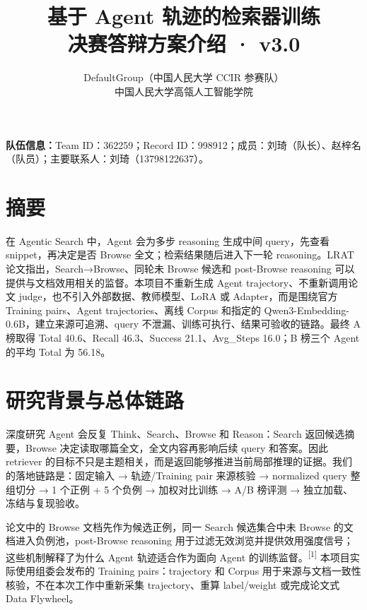 \documentclass[UTF8,a4paper,10pt]{ctexart}
\title{\bfseries 基于 Agent 轨迹的检索器训练\\[-1mm]\large 决赛答辩方案介绍 · v3.0}
\author{DefaultGroup（中国人民大学 CCIR 参赛队）\\中国人民大学高瓴人工智能学院}
\date{}
\begin{document}
\pagestyle{plain}
\maketitle
\vspace{-7pt}
\noindent\small
\textbf{队伍信息：}Team ID：362259；Record ID：998912；成员：刘琦（队长）、赵梓名（队员）；主要联系人：刘琦（13798122637）。\par
\vspace{-2pt}

\section*{摘要}
在 Agentic Search 中，Agent 会为多步 reasoning 生成中间 query，先查看 snippet，再决定是否 Browse 全文；检索结果随后进入下一轮 reasoning。LRAT 论文指出，Search→Browse、同轮未 Browse 候选和 post-Browse reasoning 可以提供与文档效用相关的监督。本项目不重新生成 Agent trajectory、不重新调用论文 judge，也不引入外部数据、教师模型、LoRA 或 Adapter，而是围绕官方 Training pairs、Agent trajectories、离线 Corpus 和指定的 Qwen3-Embedding-0.6B，建立来源可追溯、query 不泄漏、训练可执行、结果可验收的链路。最终 A 榜取得 Total 40.6、Recall 46.3、Success 21.1、Avg\_Steps 16.0；B 榜三个 Agent 的平均 Total 为 56.18。

\section{研究背景与总体链路}
深度研究 Agent 会反复 Think、Search、Browse 和 Reason：Search 返回候选摘要，Browse 决定读取哪篇全文，全文内容再影响后续 query 和答案。因此 retriever 的目标不只是主题相关，而是返回能够推进当前局部推理的证据。我们的落地链路是：固定输入 → 轨迹/Training pair 来源核验 → normalized query 整组切分 → 1 个正例 + 5 个负例 → 加权对比训练 → A/B 榜评测 → 独立加载、冻结与复现验收。

\begin{center}
\end{center}

论文中的 Browse 文档先作为候选正例，同一 Search 候选集合中未 Browse 的文档进入负例池，post-Browse reasoning 用于过滤无效浏览并提供效用强度信号；这些机制解释了为什么 Agent 轨迹适合作为面向 Agent 的训练监督。\textsuperscript{[1]} 本项目实际使用组委会发布的 Training pairs：trajectory 和 Corpus 用于来源与文档一致性核验，不在本次工作中重新采集 trajectory、重算 label/weight 或完成论文式 Data Flywheel。
\end{document}

